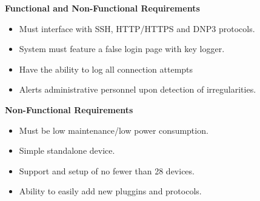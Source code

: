 \Large{\color{Blue}\textbf{Functional and Non-Functional Requirements}}
\begin{itemize}
    \item Must interface with SSH, HTTP/HTTPS and DNP3 protocols.
    \item System must feature a false login page with key logger.
    \item Have the ability to log all connection attempts  
    \item Alerts administrative personnel upon detection of irregularities.
\end{itemize}
\Large{\color{Blue}\textbf{Non-Functional Requirements}}
\begin{itemize}    
    \item Must be low maintenance/low power consumption.
    \item Simple standalone device.
    \item Support and setup of no fewer than 28 devices.
    \item Ability to easily add new pluggins and protocols.
\end{itemize}
